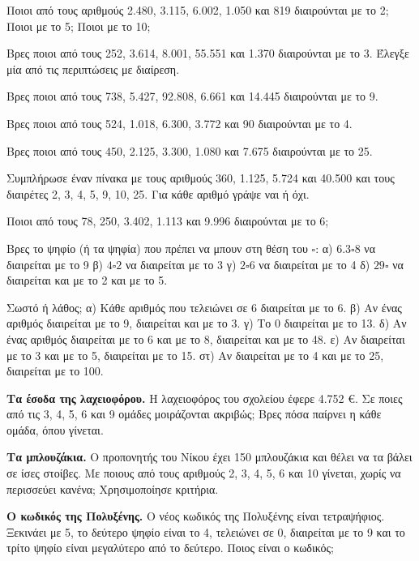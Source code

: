 

\ex Ποιοι από τους αριθμούς 2.480, 3.115, 6.002, 1.050 και 819 διαιρούνται με το 2; Ποιοι με το 5; Ποιοι με το 10;

\ex Βρες ποιοι από τους 252, 3.614, 8.001, 55.551 και 1.370 διαιρούνται με το 3. Έλεγξε μία από τις περιπτώσεις με διαίρεση.

\ex Βρες ποιοι από τους 738, 5.427, 92.808, 6.661 και 14.445 διαιρούνται με το 9.

\ex Βρες ποιοι από τους 524, 1.018, 6.300, 3.772 και 90 διαιρούνται με το 4.

\ex Βρες ποιοι από τους 450, 2.125, 3.300, 1.080 και 7.675 διαιρούνται με το 25.

\ex Συμπλήρωσε έναν πίνακα με τους αριθμούς 360, 1.125, 5.724 και 40.500 και τους διαιρέτες 2, 3, 4, 5, 9, 10, 25. Για κάθε αριθμό γράψε ναι ή όχι.

\ex Ποιοι από τους 78, 250, 3.402, 1.113 και 9.996 διαιρούνται με το 6;

\ex Βρες το ψηφίο (ή τα ψηφία) που πρέπει να μπουν στη θέση του $\square$: α) $6.3\square 8$ να διαιρείται με το 9 \quad β) $4\square 2$ να διαιρείται με το 3 \quad γ) $2\square 6$ να διαιρείται με το 4 \quad δ) $29\square$ να διαιρείται και με το 2 και με το 5.

\ex Σωστό ή λάθος; α) Κάθε αριθμός που τελειώνει σε 6 διαιρείται με το 6. \quad β) Αν ένας αριθμός διαιρείται με το 9, διαιρείται και με το 3. \quad γ) Το 0 διαιρείται με το 13. \quad δ) Αν ένας αριθμός διαιρείται με το 6 και με το 8, διαιρείται και με το 48. \quad ε) Αν διαιρείται με το 3 και με το 5, διαιρείται με το 15. \quad στ) Αν διαιρείται με το 4 και με το 25, διαιρείται με το 100.


\ex \textbf{Τα έσοδα της λαχειοφόρου.} Η λαχειοφόρος του σχολείου έφερε 4.752 €. Σε ποιες από τις 3, 4, 5, 6 και 9 ομάδες μοιράζονται ακριβώς; Βρες πόσα παίρνει η κάθε ομάδα, όπου γίνεται.

\ex \textbf{Τα μπλουζάκια.} Ο προπονητής του Νίκου έχει 150 μπλουζάκια και θέλει να τα βάλει σε ίσες στοίβες. Με ποιους από τους αριθμούς 2, 3, 4, 5, 6 και 10 γίνεται, χωρίς να περισσεύει κανένα; Χρησιμοποίησε κριτήρια.

\ex \textbf{Ο κωδικός της Πολυξένης.} Ο νέος κωδικός της Πολυξένης είναι τετραψήφιος. Ξεκινάει με 5, το δεύτερο ψηφίο είναι το 4, τελειώνει σε 0, διαιρείται με το 9 και το τρίτο ψηφίο είναι μεγαλύτερο από το δεύτερο. Ποιος είναι ο κωδικός;

